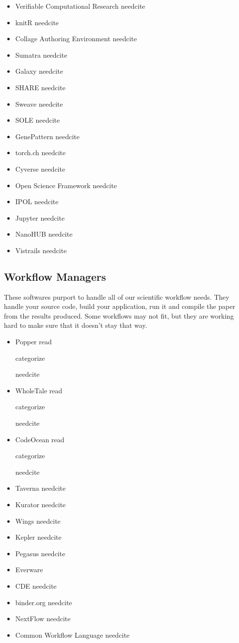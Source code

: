 \documentclass[american]{article}
\newcommand{\Read}{
	\gls{read}
}
\newcommand{\categorize}{
	\gls{categorize}
}
\newcommand{\needcite}{
	\gls{needcite}
}
\begin{document}
\begin{itemize}
\item Verifiable Computational Research \needcite
\item knitR \needcite
\item Collage Authoring Environment \needcite
\item Sumatra \needcite
\item Galaxy \needcite
\item SHARE \needcite
\item Sweave \needcite
\item SOLE \needcite
\item GenePattern \needcite
\item torch.ch \needcite
\item Cyverse \needcite
\item Open Science Framework \needcite
\item IPOL \needcite
\item Jupyter \needcite
\item NanoHUB \needcite
\item Vistrails \needcite
\end{itemize}

\subsection{Workflow Managers}

These softwares purport to handle all of our scientific workflow needs. They handle your source code, build your application, run it and compile the paper from the results produced. Some workflows may not fit, but they are working hard to make sure that it doesn't stay that way.

\begin{itemize}
\item Popper \Read \categorize \needcite
\item WholeTale \Read \categorize \needcite
\item CodeOcean \Read \categorize \needcite
\item Taverna \needcite
\item Kurator \needcite
\item Wings \needcite
\item Kepler \needcite
\item Pegasus \needcite
\item Everware \cite{everware}
\item CDE \needcite
\item binder.org \needcite
\item NextFlow \needcite
\item Common Workflow Language \needcite
\end{itemize}
\end{document}
